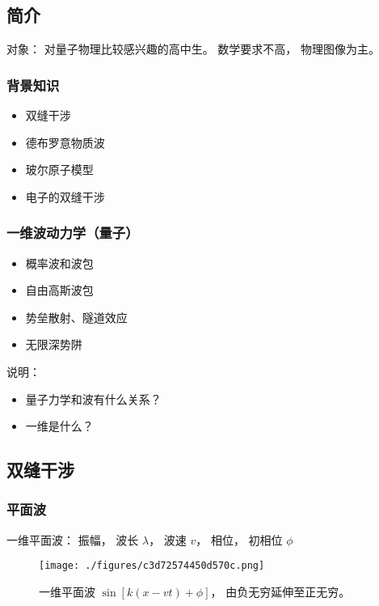 
\subsection{简介}
对象： 对量子物理比较感兴趣的高中生。 数学要求不高， 物理图像为主。

\subsubsection{背景知识}
\begin{itemize}
\item 双缝干涉
\item 德布罗意物质波
\item 玻尔原子模型
\item 电子的双缝干涉
\end{itemize}

\subsubsection{一维波动力学（量子）}
\begin{itemize}
\item 概率波和波包
\item 自由高斯波包
\item 势垒散射、隧道效应
\item 无限深势阱
\end{itemize}

说明：
\begin{itemize}
\item 量子力学和波有什么关系？
\item 一维是什么？
\end{itemize}

\subsection{双缝干涉}

\subsubsection{平面波}


一维平面波： 振幅， 波长 $\lambda$， 波速 $v$， 相位， 初相位 $\phi$
\begin{figure}[ht]
\centering
\texttt{[image: ./figures/c3d72574450d570c.png]}
\caption{一维平面波 $\sin[k(x-vt) + \phi]$， 由负无穷延伸至正无穷。} \label{fig_QMIntr_2}
\end{figure}

